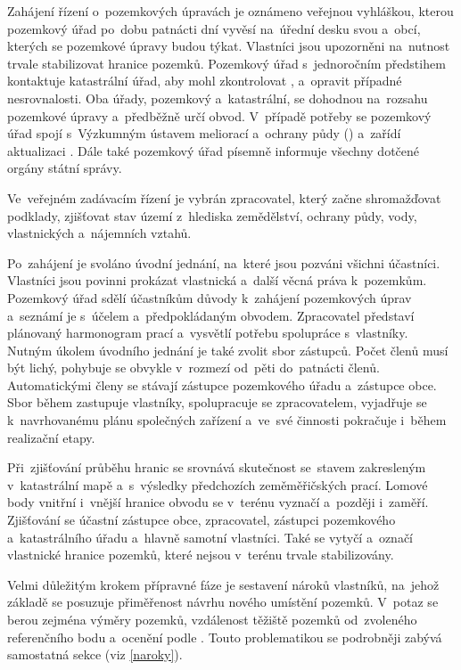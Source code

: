 Zahájení řízení o~pozemkových úpravách je oznámeno veřejnou vyhláškou,
kterou pozemkový úřad po~dobu patnácti dní vyvěsí na~úřední desku svou
a~obcí, kterých se pozemkové úpravy budou týkat. Vlastníci jsou
upozorněni na~nutnost trvale stabilizovat hranice pozemků. Pozemkový
úřad s~jednoročním předstihem kontaktuje katastrální úřad, aby mohl
zkontrolovat ,  a~opravit případné nesrovnalosti. Oba
úřady, pozemkový a~katastrální, se dohodnou na~rozsahu pozemkové
úpravy a~předběžně určí obvod. V~případě potřeby se pozemkový úřad
spojí s~Výzkumným ústavem meliorací a~ochrany půdy ()
a~zařídí aktualizaci . Dále také pozemkový úřad písemně
informuje všechny dotčené orgány státní správy.

Ve~veřejném zadávacím řízení je vybrán zpracovatel, který začne
shromažďovat podklady, zjišťovat stav území z~hlediska zemědělství,
ochrany půdy, vody, vlastnických a~nájemních vztahů.

Po~zahájení  je svoláno úvodní jednání, na~které jsou pozváni
všichni účastníci. Vlastníci jsou povinni prokázat vlastnická a~další
věcná práva k~pozemkům. Pozemkový úřad sdělí účastníkům důvody
k~zahájení pozemkových úprav a~seznámí je s~účelem a~předpokládaným
obvodem. Zpracovatel představí plánovaný harmonogram prací a~vysvětlí
potřebu spolupráce s~vlastníky. Nutným úkolem úvodního jednání je také
zvolit sbor zástupců. Počet členů musí být lichý, pohybuje se obvykle
v~rozmezí od~pěti do~patnácti členů. Automatickými členy se stávají
zástupce pozemkového úřadu a~zástupce obce. Sbor během 
zastupuje vlastníky, spolupracuje se zpracovatelem, vyjadřuje se
k~navrhovanému plánu společných zařízení a~ve~své činnosti pokračuje
i~během realizační etapy.

Při~zjišťování průběhu hranic se srovnává skutečnost se~stavem
zakresleným v~katastrální mapě a~s~výsledky předchozích zeměměřičských
prací. Lomové body vnitřní i~vnější hranice obvodu se v~terénu vyznačí
a~později i~zaměří. Zjišťování se účastní zástupce obce, zpracovatel,
zástupci pozemkového a~katastrálního úřadu a~hlavně samotní
vlastníci. Také se vytyčí a~označí vlastnické hranice pozemků, které
nejsou v~terénu trvale stabilizovány.

Velmi důležitým krokem přípravné fáze je sestavení nároků vlastníků,
na~jehož základě se posuzuje přiměřenost návrhu nového umístění
pozemků. V~potaz se berou zejména výměry pozemků, vzdálenost těžiště
pozemků od~zvoleného referenčního bodu a~ocenění podle
. Touto problematikou se podrobněji zabývá samostatná sekce
(viz \ref{naroky}).

